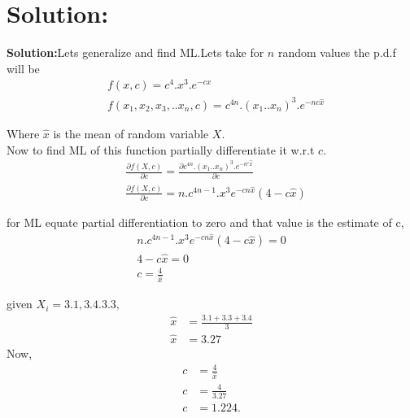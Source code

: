\documentclass{beamer}
\begin{document}
         \section{Solution:}
         \begin{frame}
             \textbf{Solution:}Lets generalize and find ML.Lets take for $n$
     random values the p.d.f will be
     \begin{align}
         &f(x,c)=c^{4}.x^{3}.e^{-cx}\\
         &f(x_{1},x_{2},x_{3},..x_{n},c)=c^{4n}.(x_{1}..x_{n})^{3}.e^{-nc\hat{x}}
         \end{align}
         \end{frame}
         \begin{frame}
             Where $\hat{x}$ is the mean of random variable $X$.\\
         Now to find ML of this function partially differentiate it w.r.t $c$.
         \begin{align}
             &\frac{\partial f(X,c)}{\partial c}=\frac{\partial c^{4n}.(x_{1}..x_{n})^{3}.e^{-n^c\hat{x}}}{\partial c}\\
             &\frac{\partial f(X,c)}{\partial c}=n.c^{4n-1}.x^{3}e^{-cn\hat{x}}(4-c\hat{x})
         \end{align}
         \end{frame}
         \begin{frame}
             for ML equate partial differentiation to zero and that value is the estimate of c,
         \begin{align}
             n.c^{4n-1}.x^{3}e^{-cn\hat{x}}(4-c\hat{x})=0\\
             4-c\hat{x}=0\\
             c=\frac{4}{\hat{x}}
         \end{align}
         
         \end{frame}
         \begin{frame}
          given $X_{i} = 3.1, 3.4.3.3,$
         \begin{align}
        \hat{x}&=\frac{3.1+3.3+3.4}{3}\\
              \hat{x}&=3.27
         \end{align}
             Now,
         \begin{align}
         c&=\frac{4}{\hat{x}}\\
         c&=\frac{4}{3.27}\\
         c&=1.224.
         \end{align}
         \end{frame}
     
\end{document}
